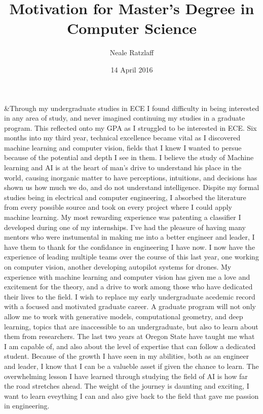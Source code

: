 \documentclass[letterpaper,10pt,titlepage]{article}
\title{Motivation for Master's Degree in Computer Science}
\author{Neale Ratzlaff}
\date{14 April 2016}
\begin{document}
\maketitle


    &Through my undergraduate studies in ECE I found difficulty in being interested in any area of study, and never imagined continuing my studies in a graduate program. This reflected onto my GPA as I struggled to be interested in ECE. 
    Six months into my third year, technical excellence became vital as I discovered machine learning and computer vision, fields that I knew I wanted to persue because of the potential and depth I see in them.
    I believe the study of Machine learning and AI is at the heart of man's drive to understand his place in the world, causing inorganic matter to have perceptions, intuitions, and decisions has shown us how much we do, and do not understand intelligence.  
    Dispite my formal studies being in electrical and computer engineering, I absorbed the literature from every possible source and took on every project where I could apply machine learning. 
    My most rewarding experience was patenting a classifier I developed during one of my internships. I've had the pleasure of having many mentors who were instumental in making me into a better engineer and leader, I have them to thank for the confidance in engineering I have now.
    I now have the experience of leading multiple teams over the course of this last year, one working on computer vision, another developing autopilot systems for drones. 
    My experience with machine learning and computer vision has given me a love and excitement for the theory, and a drive to work among those who have dedicated their lives to the field. I wish to replace my early undergraduate acedemic record with a focused and motivated graduate career.
    A graduate program will not only allow me to work with generative models, computational geometry, and deep learning, topics that are inaccessible to an undergraduate, but also to learn about them from researchers.
    The last two years at Oregon State have taught me what I am capable of, and also about the level of expertise that can follow a dedicated student. Because of the growth I have seen in my abilities, both as an engineer and leader, I know that I can be a valueble asset if given the chance to learn.  
    The overwhelming lesson I have learned through studying the field of AI is how far the road stretches ahead. The weight of the journey is daunting and exciting, I want to learn eveything I can and also give back to the field that gave me passion in engineering. 
\end{document}
